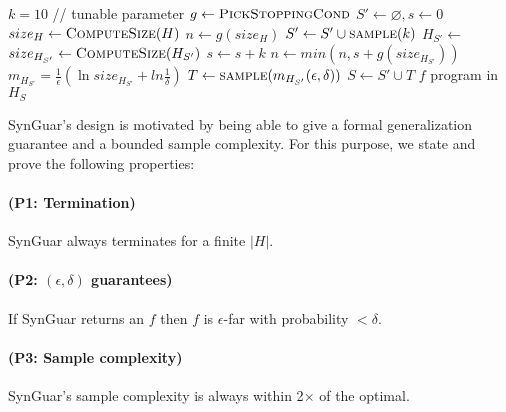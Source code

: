 \documentclass[11pt]{extarticle}
\newcommand{\tool}{{\sc SynGuar}\xspace}
\begin{document}
\begin{algorithm}[t]
    \caption{\tool Synthesis returns a program with error smaller than $\epsilon$ with probability higher than $1-\delta$}
    \label{alg:main}
    \begin{algorithmic}[1]
      \Procedure{\tool}{$\epsilon, \delta$}
      \State $k = 10$ // tunable parameter
      \State $g \gets \Call{PickStoppingCond}{}$ \label{alg:pick-cond}
      \State $S' \gets \varnothing, s \gets 0$
      \State $size_{H} \gets \Call{ComputeSize}{H}$ \label{alg:call-compute} 
      \State $n \gets g(size_{H})$
      \State $S' \gets S' \cup \Call{sample}{k}$
      \State $H_{S'} \gets $  \label{alg:call-update}
      \State $size_{H_{S'}} \gets \Call{ComputeSize}{H_{S'}}$ \label{alg:call-compute}
      \State $s \gets s + k$
      \State $n \gets min(n, s+g(size_{H_{S'}}))$ \label{alg:min-thresh}
      \EndWhile
      \State $m_{H_{S'}}=\frac{1}{\epsilon}(\ln{size_{H_{S'}}} + ln{\frac{1}{\delta}})$
      \State $T \gets \Call{sample}{m_{H_{S'}}(\epsilon, \delta)}$
      \State $S \gets S'\cup T$ 
      \State \Return $f$ program in $H_S$
      \EndProcedure
    \end{algorithmic}
\end{algorithm}

\tool's design is motivated by being able to give a formal generalization guarantee and a bounded sample complexity. For this purpose, we state and prove the following properties: 

\paragraph{(P1: Termination)} \tool always terminates for a finite $|H|$.

\paragraph{(P2: $(\epsilon, \delta)$ guarantees)} If \tool returns an $f$ then $f$ is $\epsilon$-far with probability $<\delta$.

\paragraph{(P3: Sample complexity)} \tool's sample complexity is always within 2$\times$ of the optimal.
\end{document}
